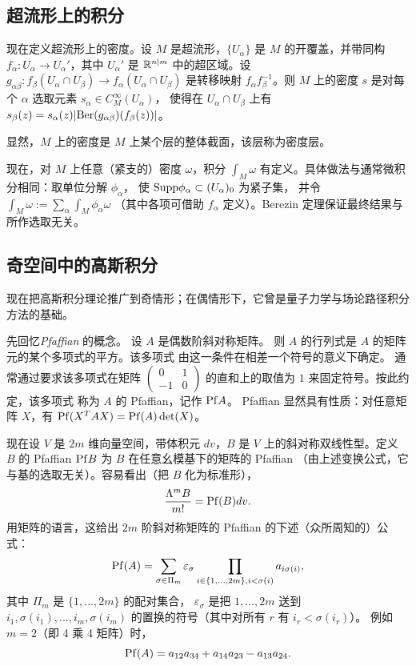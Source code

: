 \subsection{超流形上的积分}

现在定义超流形上的密度。设 $M$ 是超流形，$\lbrace{U_{\alpha}\rbrace}$ 是 $M$ 的开覆盖，并带同构
$f_{\alpha}: U_\alpha\to U_{\alpha}'$，其中 $U_{\alpha}'$ 是 $\Bbb R^{n|m}$ 中的超区域。设 $g_{\alpha\beta}: f_\beta (U_\alpha\cap U_\beta)\to
f_\alpha(U_\alpha\cap U_\beta)$ 是转移映射
$f_\alpha f_\beta^{-1}$。则 $M$ 上的密度 $s$ 是对每个 $\alpha$ 选取元素
$s_\alpha\in C^\infty_M(U_\alpha)$，
使得在 $U_\alpha\cap U_\beta$ 上有
$s_\beta(z)=s_\alpha(z) |{\rm Ber}(g_{\alpha\beta})(f_\beta(z))|$。

\begin{remark} 显然，$M$ 上的密度是 $M$ 上某个层的整体截面，该层称为密度层。
\end{remark}

现在，对 $M$ 上任意（紧支的）密度 $\omega$，积分
$\int_M \omega$ 有定义。具体做法与通常微积分相同：取单位分解 $\phi_\alpha$，
使 ${\rm Supp}\phi_\alpha\subset (U_\alpha)_0$ 为紧子集，
并令 $\int_M\omega:=\sum_\alpha \int_M\phi_\alpha\omega$
（其中各项可借助 $f_\alpha$ 定义）。Berezin 定理保证最终结果与所作选取无关。

\subsection{奇空间中的高斯积分}

现在把高斯积分理论推广到奇情形；在偶情形下，它曾是量子力学与场论路径积分方法的基础。

先回忆\emph{Pfaffian} 的概念。
设 $A$ 是偶数阶斜对称矩阵。
则 $A$ 的行列式是 $A$ 的矩阵元的某个多项式的平方。该多项式
由这一条件在相差一个符号的意义下确定。
通常通过要求该多项式在矩阵 $\begin{pmatrix}
0&1\\ -1&0\end{pmatrix}$ 的直和上的取值为 $1$ 来固定符号。按此约定，该多项式
称为 $A$ 的 Pfaffian，记作 ${\rm Pf}A$。
Pfaffian 显然具有性质：对任意矩阵 $X$，有 ${\rm Pf}(X^TAX)=
{\rm Pf}(A)\det(X)$。

现在设 $V$ 是 $2m$ 维向量空间，带体积元 $dv$，$B$
是 $V$ 上的斜对称双线性型。定义 $B$ 的 Pfaffian ${\rm Pf}B$
为 $B$ 在任意幺模基下的矩阵的 Pfaffian
（由上述变换公式，它与基的选取无关）。容易看出（把 $B$ 化为标准形），
$$
\frac{\Lambda^mB}{m!}={\rm Pf}(B)dv.
$$
用矩阵的语言，这给出 $2m$ 阶斜对称矩阵的 Pfaffian 的下述（众所周知的）公式：
$$
{\rm Pf}(A)=\sum_{\sigma\in \Pi_m}\varepsilon_\sigma
\prod_{i\in \lbrace{1,...,2m\rbrace},
i<\sigma(i)}a_{i\sigma(i)},
$$
其中 $\Pi_m$ 是 $\lbrace{1,...,2m\rbrace}$ 的配对集合，
$\varepsilon_\sigma$ 是把 $1,...,2m$ 送到 $i_1,\sigma(i_1),...,i_m,\sigma(i_m)$
的置换的符号（其中对所有 $r$ 有 $i_r<\sigma(i_r)$）。
例如 $m=2$（即 4 乘 4 矩阵）时，
$$
{\rm Pf}(A)=a_{12}a_{34}+a_{14}a_{23}-a_{13}a_{24}.
$$

